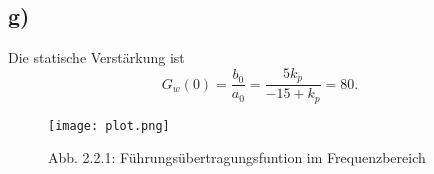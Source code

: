 \documentclass[11pt]{scrartcl} %
\begin{document}
\subsection*{g)}
Die statische Verstärkung ist
\begin{equation*}
G_w(0)=\dfrac{b_0}{a_0} = \dfrac{5k_p}{-15+k_p} = 80.
\end{equation*}
\begin{figure}[H]
	\centering
	\texttt{[image: plot.png]}
	\captionsetup{labelformat=empty}
	\caption{Abb. 2.2.1: Führungsübertragungsfuntion im Frequenzbereich}
\end{figure}
\end{document}
